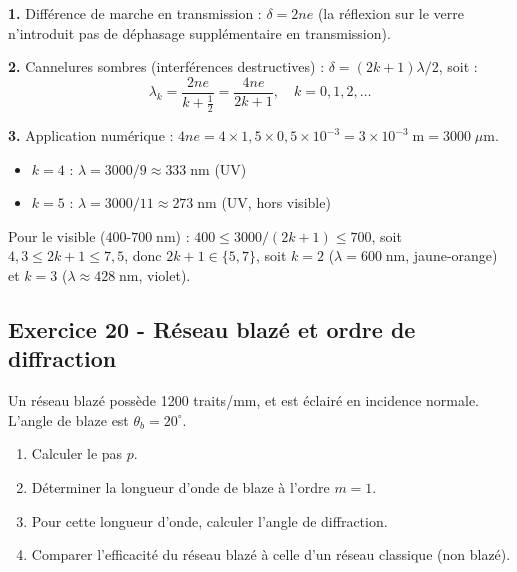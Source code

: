 \documentclass[12pt,a4paper]{article}
\begin{document}
\begin{boitecorrige}
\textbf{1.} Différence de marche en transmission : $\delta = 2ne$ (la réflexion sur le verre n'introduit pas de déphasage supplémentaire en transmission).

\textbf{2.} Cannelures sombres (interférences destructives) : $\delta = (2k+1)\lambda/2$, soit :
\[
\lambda_k = \frac{2ne}{k+\frac{1}{2}} = \frac{4ne}{2k+1}, \quad k = 0, 1, 2, \ldots
\]

\textbf{3.} Application numérique : $4ne = 4\times 1{,}5 \times 0{,}5\times10^{-3} = 3\times10^{-3}\;\text{m} = 3000\;\mu\text{m}$.
\begin{itemize}[nosep]
  \item $k=4$ : $\lambda = 3000/9 \approx 333\;\text{nm}$ (UV)
  \item $k=5$ : $\lambda = 3000/11 \approx 273\;\text{nm}$ (UV, hors visible)
\end{itemize}
Pour le visible ($400$-$700\;\text{nm}$) : $400 \leq 3000/(2k+1) \leq 700$, soit $4{,}3 \leq 2k+1 \leq 7{,}5$, donc $2k+1 \in \{5, 7\}$, soit $k=2$ ($\lambda = 600\;\text{nm}$, jaune-orange) et $k=3$ ($\lambda \approx 428\;\text{nm}$, violet).
\end{boitecorrige}

\subsection*{Exercice 20 - Réseau blazé et ordre de diffraction \niveau{\difficile}}

\begin{boiteexercice}
Un réseau blazé possède 1200 traits/mm, et est éclairé en incidence normale. L'angle de blaze est $\theta_b = 20^\circ$.
\begin{enumerate}
  \item Calculer le pas $p$.
  \item Déterminer la longueur d'onde de blaze à l'ordre $m=1$.
  \item Pour cette longueur d'onde, calculer l'angle de diffraction.
  \item Comparer l'efficacité du réseau blazé à celle d'un réseau classique (non blazé).
\end{enumerate}
\end{boiteexercice}
\end{document}
